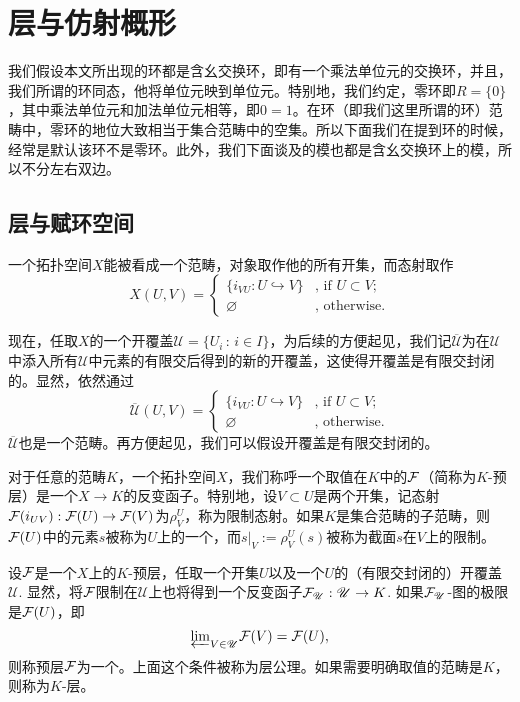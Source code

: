 
\chapter{层与仿射概形}

我们假设本文所出现的环都是含幺交换环，即有一个乘法单位元的交换环，并且，我们所谓的环同态，他将单位元映到单位元。特别地，我们约定，零环即$R=\{0\}$，其中乘法单位元和加法单位元相等，即$0=1$。在环（即我们这里所谓的环）范畴中，零环的地位大致相当于集合范畴中的空集。所以下面我们在提到环的时候，经常是默认该环不是零环。此外，我们下面谈及的模也都是含幺交换环上的模，所以不分左右双边。

\section{层与赋环空间}

\begin{para}
一个拓扑空间$X$能被看成一个范畴，对象取作他的所有开集，而态射取作
\[
	X(U,V)=\begin{cases}
	\bigl\{i_{VU}:U\hookrightarrow V\bigr\}&\text{, if }U\subset V\text{;}\\
	\varnothing&\text{, otherwise}.
	\end{cases}
\]

现在，任取$X$的一个开覆盖$\mathscr{U}=\{U_i\,:\, i\in I\}$，为后续的方便起见，我们记$\overline{\mathscr{U}}$为在$\mathscr{U}$中添入所有$\mathscr{U}$中元素的有限交后得到的新的开覆盖，这使得开覆盖是有限交封闭的。显然，依然通过
\[
	\overline{\mathscr{U}}(U,V)=\begin{cases}
	\bigl\{i_{VU}:U\hookrightarrow V\bigr\}&\text{, if }U\subset V\text{;}\\
	\varnothing&\text{, otherwise}.
	\end{cases}
\]
$\overline{\mathscr{U}}$也是一个范畴。再方便起见，我们可以假设开覆盖是有限交封闭的。
\end{para}

\begin{para}
对于任意的范畴$K$，一个拓扑空间$X$，我们称呼一个取值在$K$中的$\mathcal{F}$（简称为$K$-预层）是一个$X\to K$的反变函子。特别地，设$V\subset U$是两个开集，记态射$\mathcal{F}(i_{UV}):\mathcal{F}(U)\to \mathcal{F}(V)$为$\rho^U_{V}$，称为限制态射。如果$K$是集合范畴的子范畴，则$\mathcal{F}(U)$中的元素$s$被称为$U$上的一个，而$s|_V:=\rho^U_V(s)$被称为截面$s$在$V$上的限制。

设$\mathcal{F}$是一个$X$上的$K$-预层，任取一个开集$U$以及一个$U$的（有限交封闭的）开覆盖$\mathscr{U}$. 显然，将$\mathcal{F}$限制在$\mathscr{U}$上也将得到一个反变函子$\mathcal{F}_\mathscr{U}:\mathscr{U}\to K$. 如果$\mathcal{F}_\mathscr{U}$-图的极限是$\mathcal{F}(U)$，即
\[
	{\varprojlim}_{V\in \mathscr{U}}\mathcal{F}(V)=\mathcal{F}(U),
\]
则称预层$\mathcal{F}$为一个。上面这个条件被称为层公理。如果需要明确取值的范畴是$K$，则称为$K$-层。
\end{para}

